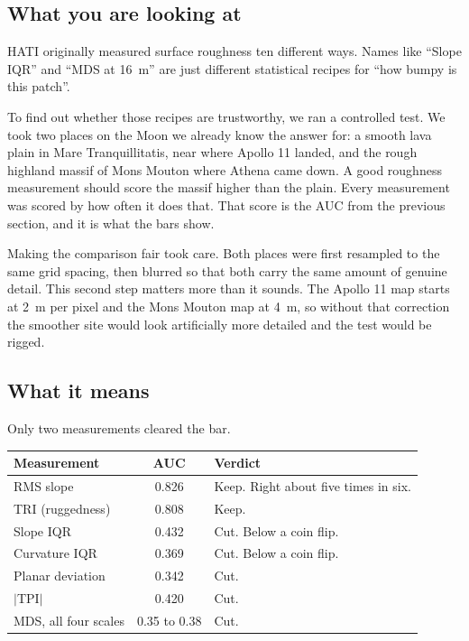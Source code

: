 \documentclass[11pt]{article}
\begin{document}
\subsection{What you are looking at}

HATI originally measured surface roughness ten different ways. Names like ``Slope
IQR'' and ``MDS at \SI{16}{\meter}'' are just different statistical recipes for
``how bumpy is this patch''.

To find out whether those recipes are trustworthy, we ran a controlled test. We took
two places on the Moon we already know the answer for: a smooth lava plain in Mare
Tranquillitatis, near where Apollo 11 landed, and the rough highland massif of Mons
Mouton where Athena came down. A good roughness measurement should score the massif
higher than the plain. Every measurement was scored by how often it does that. That
score is the AUC from the previous section, and it is what the bars show.

Making the comparison fair took care. Both places were first resampled to the same
grid spacing, then blurred so that both carry the same amount of genuine detail. This
second step matters more than it sounds. The Apollo 11 map starts at \SI{2}{\meter}
per pixel and the Mons Mouton map at \SI{4}{\meter}, so without that correction the
smoother site would look artificially more detailed and the test would be rigged.

\subsection{What it means}

Only two measurements cleared the bar.

\begin{center}
\begin{tabular}{lcl}
\toprule
Measurement & AUC & Verdict \\
\midrule
RMS slope & \num{0.826} & Keep. Right about five times in six. \\
TRI (ruggedness) & \num{0.808} & Keep. \\
\midrule
Slope IQR & \num{0.432} & Cut. Below a coin flip. \\
Curvature IQR & \num{0.369} & Cut. Below a coin flip. \\
Planar deviation & \num{0.342} & Cut. \\
$|$TPI$|$ & \num{0.420} & Cut. \\
MDS, all four scales & \num{0.35} to \num{0.38} & Cut. \\
\bottomrule
\end{tabular}
\end{center}
\end{document}
